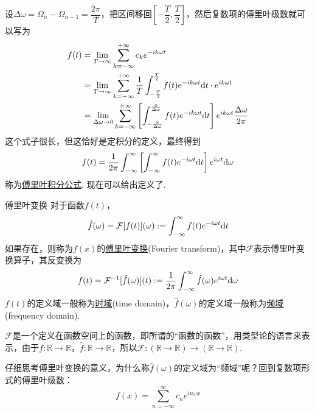\vspace{0.5cm}

设\(\Delta\omega=\Omega_n-\Omega_{n-1}=\dfrac{2\pi}{T}\)，把区间移回\([-\dfrac{T}{2},\dfrac{T}{2}]\)，然后复数项的傅里叶级数就可以写为
\begin{align*}
    f(t) &= \lim_{T \to \infty}\sum_{k=-\infty}^{+\infty}c_ke^{-ik\omega t} \\
    &= \lim_{T \to \infty}\sum_{k=-\infty}^{+\infty}\frac{1}{T} \int_{-\frac{T}{2}}^{\frac{T}{2}}f(t)e^{-ik\omega t}{\rm d}t\cdot e^{ik\omega t} \\
    &= \lim_{\Delta\omega \to 0}\sum_{k=-\infty}^{+\infty} \left[\int_{-\frac{\pi}{\Delta\omega}}^{\frac{\pi}{\Delta\omega}}f(t)e^{-ik\omega t}{\rm d}t \right]e^{ik\omega t}\frac{\Delta\omega}{2\pi}
\end{align*}
这个式子很长，但这恰好是定积分的定义，最终得到
\[ f(t) = \frac{1}{2\pi}\int_{-\infty}^{\infty} \left[\int_{-\infty}^{\infty}f(t)e^{-i\omega t}{\rm d}t \right]e^{i\omega t}{\rm d}\omega \]
称为\uline{傅里叶积分公式}. 现在可以给出定义了.

\begin{definition}{傅里叶变换}
    对于函数\(f(t)\)，
    \[\hat{f}(\omega) = \mathcal{F}[f(t)](\omega) := \int_{-\infty}^{\infty}f(t)e^{-i\omega t}{\rm d}t\]
    如果存在，则称为\(f(x)\)的\uline{傅里叶变换}(Fourier transform)，其中\(\mathcal{F}\)表示傅里叶变换算子，其反变换为
    \[f(t) = \mathcal{F}^{-1}[\hat{f}(\omega)](t) := \frac{1}{2\pi}\int_{-\infty}^{\infty}\hat{f}(\omega)e^{i\omega t}{\rm d}\omega\]
    \(f(t)\)的定义域一般称为\uline{时域}(time domain)，\(\hat{f}(\omega)\)的定义域一般称为\uline{频域}(frequency domain).
\end{definition}
\(\mathcal{F}\)是一个定义在函数空间上的函数，即所谓的“函数的函数”，用类型论的语言来表示，由于\(f:\mathbb{R}\to\mathbb{R}\)，\(\hat{f}:\mathbb{R}\to\mathbb{R}\)，所以\(\mathcal{F}:(\mathbb{R}\to\mathbb{R})\to(\mathbb{R}\to\mathbb{R})\). 

\vspace{1cm}

仔细思考傅里叶变换的意义，为什么称\(\hat{f}(\omega)\)的定义域为“频域”呢？回到复数项形式的傅里叶级数：
\[f(x) = \sum_{n=-\infty}^{\infty}c_ne^{in\omega x}\]


